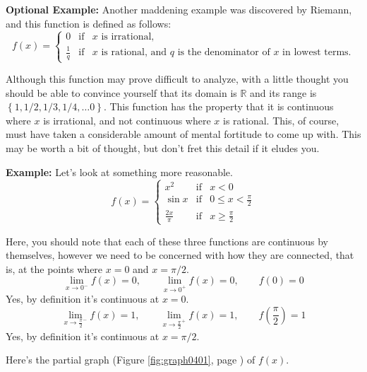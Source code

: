 \documentclass[12pt,addpoints, answers, fleqn]{exam}
\begin{document}
\textbf{Optional Example:} Another maddening example was discovered by Riemann, and this function is defined as follows:
\[
f \left( x \right) = \left\{ {\begin{array}{ccl}
  {0} & {\mbox{if}} & {\mbox{$x$ is irrational,}}\\
  {\displaystyle \frac{1}{q}} & {\mbox{if}} & {\mbox{$x$ is rational, and $q$ is the denominator of $x$ in lowest terms.}}
\end{array}} \right.
\]
\begin{solution}
Although this function may prove difficult to analyze, with a little thought you should be able to convince yourself that its domain is $\mathbb{R}$ and its range is $\left\{ 1, 1/2, 1/3, 1/4, \ldots 0\right\}$. This function has the property that it is continuous where $x$ is irrational, and not continuous where $x$ is rational. This, of course, must have taken a considerable amount of mental fortitude to come up with. This may be worth a bit of thought, but don't fret this detail if it eludes you.
\end{solution}


\textbf{Example:} Let's look at something more reasonable.
\[
f \left( x \right) = \left\{ {\begin{array}{ccc}
  {x^2} & {\mbox{if}} & {x<0} \\
  {\sin x} & {\mbox{if}} & {0 \leq x < \frac{\pi}{2}} \\
  {\displaystyle \frac{2x}{\pi}} & {\mbox{if}} & {x \geq \frac{\pi}{2}}
\end{array}} \right.
\]
\begin{solution}
Here, you should note that each of these three functions are continuous by themselves, however we need to be concerned with how they are connected, that is, at the points where $x= 0$ and $x = \pi/2$.
\[
\mathop {\lim }\limits_{x \to 0^-} f \left( x \right) = 0, \qquad 
\mathop {\lim }\limits_{x \to 0^+} f \left( x \right) = 0, \qquad f\left( 0 \right) = 0
\]
Yes, by definition it's continuous at $x=0$.
\[
\mathop {\lim }\limits_{x \to \frac{\pi}{2}^-} f \left( x \right) = 1, \qquad 
\mathop {\lim }\limits_{x \to \frac{\pi}{2}^+} f \left( x \right) = 1, \qquad f\left( \frac{\pi}{2} \right) = 1
\]
Yes, by definition it's continuous at $x=\pi/2$.

Here's the partial graph (Figure \ref{fig:graph0401}, page \pageref{fig:graph0401}) of $f\left( x \right)$.
\end{solution}
\end{document}
